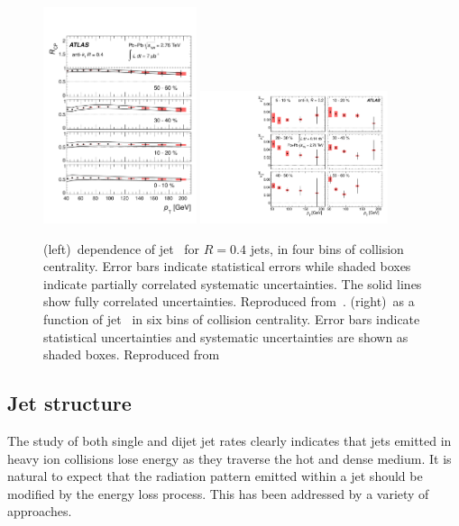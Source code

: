 \begin{figure}[!th]
\begin{center}
\includegraphics[width=0.4\textwidth]{jetfigures/ATLAS_jetRCP_04.pdf}
\includegraphics[width=0.49\textwidth]{jetfigures/ATLAS_jetv2.pdf}
\caption{
(left)\pT\ dependence of jet \Rcp\ for  $R=0.4$ jets,
in four bins of collision centrality. Error bars indicate
statistical errors while shaded boxes indicate
partially correlated systematic uncertainties. 
The solid lines show fully correlated uncertainties. 
Reproduced from~\cite{Aad:2012is}.
(right)\vtjet\ as a function of jet \pT\ in six bins of 
collision centrality.
Error bars indicate statistical uncertainties and 
systematic uncertainties are shown as shaded boxes. Reproduced from~\cite{Aad:2013sla}
}
\label{fig:pas:rcprfour}
\end{center}
\end{figure}

\subsection{Jet structure}

The study of both single and dijet jet rates clearly indicates that jets emitted in heavy ion 
collisions lose energy as they traverse the hot and dense medium.  It is natural to expect
that the radiation pattern emitted within a jet should be modified by the energy loss
process.  This has been addressed by a variety of approaches.

